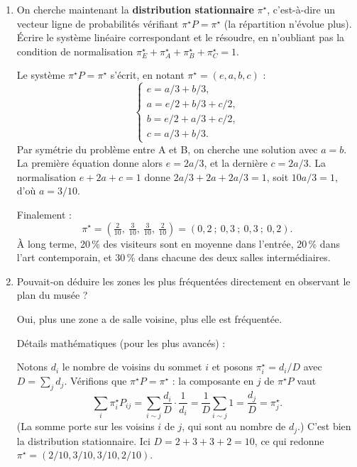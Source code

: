 \begin{enumerate}[label=\alph*), itemsep=0.6em]
\begin{solution}
$\pi_2 = \pi_1 P = (1/2 \cdot 1/3 + 1/2 \cdot 1/3,\ 1/2 \cdot 0 + 1/2 \cdot 1/3,\ 1/2 \cdot 1/3 + 1/2 \cdot 0,\ 1/2 \cdot 1/3 + 1/2 \cdot 1/3)$
$= (1/3,\ 1/6,\ 1/6,\ 1/3)$.

Après 20 minutes, un tiers des visiteurs est revenu à l'entrée, un tiers a atteint la salle d'art contemporain, et le reste se partage entre A et B.
\end{solution}

  \item On cherche maintenant la \textbf{distribution stationnaire} $\pi^\star$, c'est-à-dire un vecteur ligne de probabilités vérifiant $\pi^\star P = \pi^\star$ (la répartition n'évolue plus). Écrire le système linéaire correspondant et le résoudre, en n'oubliant pas la condition de normalisation $\pi_E^\star + \pi_A^\star + \pi_B^\star + \pi_C^\star = 1$.

\begin{solution}
Le système $\pi^\star P = \pi^\star$ s'écrit, en notant $\pi^\star = (e, a, b, c)$ :
\[
\begin{cases}
  e = a/3 + b/3, \\
  a = e/2 + b/3 + c/2, \\
  b = e/2 + a/3 + c/2, \\
  c = a/3 + b/3.
\end{cases}
\]
Par symétrie du problème entre A et B, on cherche une solution avec $a = b$. La première équation donne alors $e = 2a/3$, et la dernière $c = 2a/3$. La normalisation $e + 2a + c = 1$ donne $2a/3 + 2a + 2a/3 = 1$, soit $10a/3 = 1$, d'où $a = 3/10$.

Finalement :
\[
  \pi^\star = \left( \tfrac{2}{10},\ \tfrac{3}{10},\ \tfrac{3}{10},\ \tfrac{2}{10} \right) = (0{,}2\ ;\ 0{,}3\ ;\ 0{,}3\ ;\ 0{,}2).
\]
À long terme, 20\,\% des visiteurs sont en moyenne dans l'entrée, 20\,\% dans l'art contemporain, et 30\,\% dans chacune des deux salles intermédiaires.
\end{solution}

  \item Pouvait-on déduire les zones les plus fréquentées directement en observant le plan du musée ?

\begin{solution}

Oui, plus une zone a de salle voisine, plus elle est fréquentée. 

Détails mathématiques (pour les plus avancés) :

Notons $d_i$ le nombre de voisins du sommet $i$ et posons $\pi_i^\star = d_i / D$ avec $D = \sum_j d_j$. Vérifions que $\pi^\star P = \pi^\star$ : la composante en $j$ de $\pi^\star P$ vaut
\[
  \sum_i \pi_i^\star P_{ij} = \sum_{i \sim j} \frac{d_i}{D} \cdot \frac{1}{d_i} = \frac{1}{D} \sum_{i \sim j} 1 = \frac{d_j}{D} = \pi_j^\star.
\]
(La somme porte sur les voisins $i$ de $j$, qui sont au nombre de $d_j$.) C'est bien la distribution stationnaire. Ici $D = 2 + 3 + 3 + 2 = 10$, ce qui redonne $\pi^\star = (2/10, 3/10, 3/10, 2/10)$.


\end{solution}
\end{enumerate}

